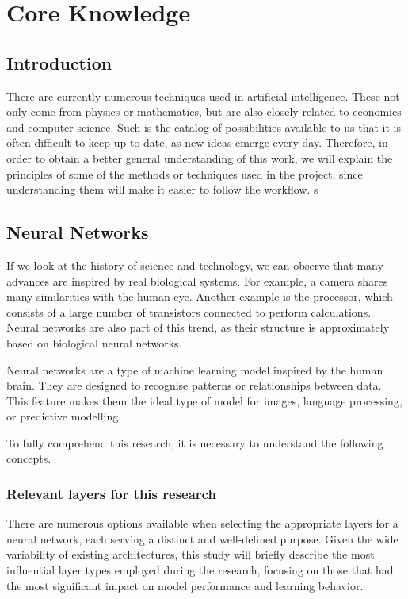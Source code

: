 \chapter{Core Knowledge}\label{cap:planificación}

\section{Introduction}

There are currently numerous techniques used in artificial intelligence. These not only come from physics or mathematics, but are also closely related to economics and computer science. Such is the catalog of possibilities available to us that it is often difficult to keep up to date, as new ideas emerge every day. Therefore, in order to obtain a better general understanding of this work, we will explain the principles of some of the methods or techniques used in the project, since understanding them will make it easier to follow the workflow. 
s
\section{Neural Networks}

If we look at the history of science and technology, we can observe that many advances are inspired by real biological systems. For example, a camera shares many similarities with the human eye. Another example is the processor, which consists of a large number of transistors connected to perform calculations. Neural networks are also part of this trend, as their structure is approximately based on biological neural networks. 

Neural networks are a type of machine learning model inspired by the human brain. They are designed to recognise patterns or relationships between data. This feature makes them the ideal type of model for images, language processing, or predictive modelling.

To fully comprehend this research, it is necessary to understand the following concepts.

\subsection{Relevant layers for this research}

There are numerous options available when selecting the appropriate layers for a neural network, each serving a distinct and well-defined purpose. Given the wide variability of existing architectures, this study will briefly describe the most influential layer types employed during the research, focusing on those that had the most significant impact on model performance and learning behavior.

